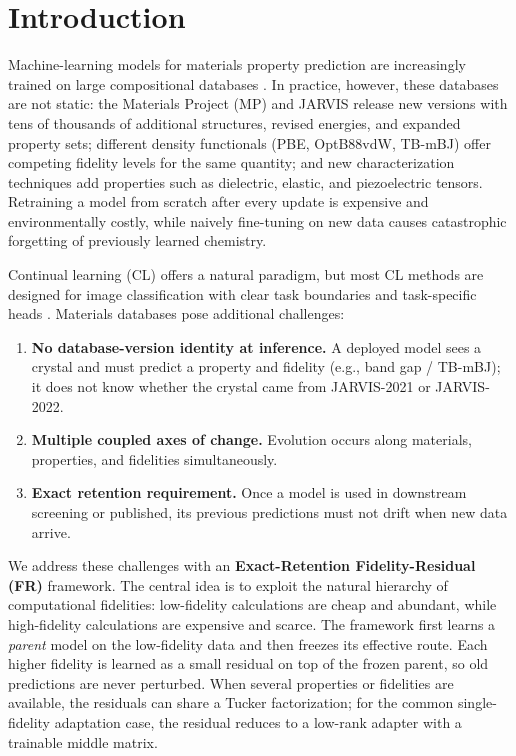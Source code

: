 \documentclass{article}
\theoremstyle{plain}
\theoremstyle{definition}
\theoremstyle{remark}
\begin{document}
\section{Introduction}

Machine-learning models for materials property prediction are increasingly trained on large compositional databases \cite{jain2013materials, choudhary2020joint}. In practice, however, these databases are not static: the Materials Project (MP) and JARVIS release new versions with tens of thousands of additional structures, revised energies, and expanded property sets; different density functionals (PBE, OptB88vdW, TB-mBJ) offer competing fidelity levels for the same quantity; and new characterization techniques add properties such as dielectric, elastic, and piezoelectric tensors. Retraining a model from scratch after every update is expensive and environmentally costly, while naively fine-tuning on new data causes catastrophic forgetting of previously learned chemistry.

Continual learning (CL) offers a natural paradigm, but most CL methods are designed for image classification with clear task boundaries and task-specific heads \cite{kirkpatrick2017overcoming, chaudhry2018riemannian}. Materials databases pose additional challenges:
\begin{enumerate}[leftmargin=*]
    \item \textbf{No database-version identity at inference.} A deployed model sees a crystal and must predict a property and fidelity (e.g., band gap / TB-mBJ); it does not know whether the crystal came from JARVIS-2021 or JARVIS-2022.
    \item \textbf{Multiple coupled axes of change.} Evolution occurs along materials, properties, and fidelities simultaneously.
    \item \textbf{Exact retention requirement.} Once a model is used in downstream screening or published, its previous predictions must not drift when new data arrive.
\end{enumerate}

We address these challenges with an \textbf{Exact-Retention Fidelity-Residual (FR)} framework. The central idea is to exploit the natural hierarchy of computational fidelities: low-fidelity calculations are cheap and abundant, while high-fidelity calculations are expensive and scarce. The framework first learns a \emph{parent} model on the low-fidelity data and then freezes its effective route. Each higher fidelity is learned as a small residual on top of the frozen parent, so old predictions are never perturbed. When several properties or fidelities are available, the residuals can share a Tucker factorization; for the common single-fidelity adaptation case, the residual reduces to a low-rank adapter with a trainable middle matrix.
\end{document}
